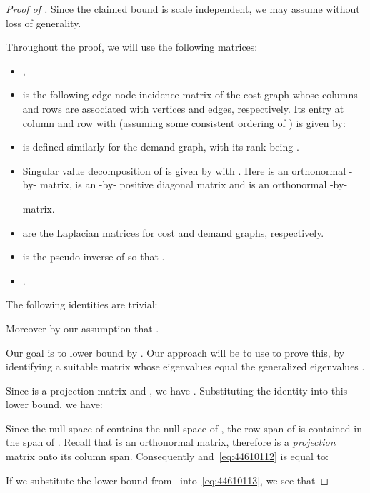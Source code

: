 \documentclass{article}
\newcommand{\vnote}[1]{}
\newcommand{\aknote}[1]{}
\begin{document}
\begin{proof}[Proof of ]
  Since the claimed bound is scale independent, we may assume  without loss of generality.

  Throughout the proof, we will use the following matrices:
\begin{itemize}
\item ,
\item  is the following edge-node
  incidence matrix of the cost graph whose columns and rows are
  associated with vertices and edges, respectively. Its entry at
  column  and row  with 
  (assuming some consistent ordering of ) is given by:

\item  is defined similarly for the
  demand graph, with its rank being .
\item Singular value decomposition of  is given by  with . Here  is an
  orthonormal -by- matrix,  is an -by-
  positive diagonal matrix and  is an orthonormal -by-

  matrix. \item  are the Laplacian matrices for cost and demand
  graphs, respectively.
\item  is the pseudo-inverse of  so that
  .
\item .
\end{itemize}
\vnote{Was the earlier argument, which argued about spectrum of  to
  capture generalized eigenvalues, wrong?}  \aknote{Nope. But I
  thought this proof is simpler.}
The following identities are trivial:
 
Moreover
 by our assumption that .
	
Our goal is to lower bound  by .  Our approach will be to use
 to prove this, by identifying a suitable matrix
whose eigenvalues equal the generalized eigenvalues .
		
Since  is a projection matrix and , we
have  .  Substituting the
identity  into
this lower bound, we have:

Since the null space of  contains the null
space of , the row span of  is contained in the
span of . Recall that  is an orthonormal matrix, therefore  is a {\em projection} matrix onto its column span. Consequently
 and~\cref{eq:44610112} is
equal to: \vnote{It might be good to remind reader of relation between
  SVD and null space and justify .}

If we substitute the lower bound from~
into~\cref{eq:44610113}, we see that


\end{proof}
\end{document}
